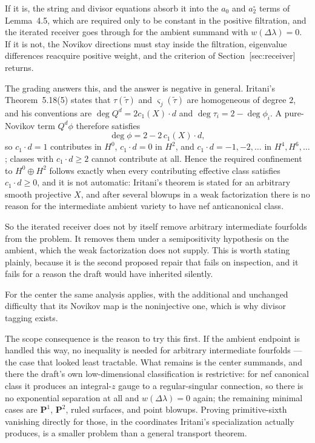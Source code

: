 \documentclass[11pt]{article}
\theoremstyle{definition}
\theoremstyle{remark}
\newcommand{\PP}{\mathbf P}
\begin{document}
If it is, the string and divisor equations absorb it into the $a_0$ and
$a_2^\circ$ terms of Lemma~4.5, which are required only to be constant in the
positive filtration, and the iterated receiver goes through for the ambient
summand with $w(\Delta\lambda)=0$. If it is not, the Novikov directions must
stay inside the filtration, eigenvalue differences reacquire positive weight,
and the criterion of Section~\textup{[sec:receiver]} returns.

The grading answers this, and the answer is negative in general. Iritani's
Theorem~5.18(5) states that $\tau(\widetilde\tau)$ and
$\varsigma_j(\widetilde\tau)$ are homogeneous of degree $2$, and his conventions
are $\deg Q^d=2c_1(X)\cdot d$ and $\deg\tau_i=2-\deg\phi_i$. A pure-Novikov term
$Q^d\phi$ therefore satisfies
\[
  \deg\phi=2-2\,c_1(X)\cdot d,
\]
so $c_1\cdot d=1$ contributes in $H^0$, $c_1\cdot d=0$ in $H^2$, and
$c_1\cdot d=-1,-2,\dots$ in $H^4,H^6,\dots$; classes with $c_1\cdot d\ge2$
cannot contribute at all. Hence the required confinement to $H^0\oplus H^2$
follows exactly when every contributing effective class satisfies
$c_1\cdot d\ge0$, and it is not automatic: Iritani's theorem is stated for an
arbitrary smooth projective $X$, and after several blowups in a weak
factorization there is no reason for the intermediate ambient variety to have
nef anticanonical class.

So the iterated receiver does not by itself remove arbitrary intermediate
fourfolds from the problem. It removes them under a semipositivity hypothesis on
the ambient, which the weak factorization does not supply. This is worth stating
plainly, because it is the second proposed repair that fails on inspection, and
it fails for a reason the draft would have inherited silently.

For the center the same analysis applies, with the additional and unchanged
difficulty that its Novikov map is the noninjective one, which is why divisor
tagging exists.

The scope consequence is the reason to try this first. If the ambient endpoint
is handled this way, no inequality is needed for arbitrary intermediate
fourfolds --- the case that looked least tractable. What remains is the center
summands, and there the draft's own low-dimensional classification is
restrictive: for nef canonical class it produces an integral-$z$ gauge to a
regular-singular connection, so there is no exponential separation at all and
$w(\Delta\lambda)=0$ again; the remaining minimal cases are $\PP^1$, $\PP^2$,
ruled surfaces, and point blowups. Proving primitive-sixth vanishing directly
for those, in the coordinates Iritani's specialization actually produces, is a
smaller problem than a general transport theorem.
\end{document}
